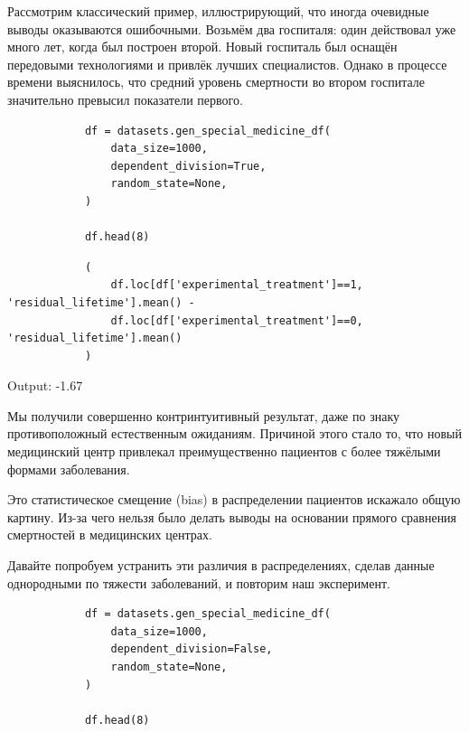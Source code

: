 \documentclass{article}
\begin{document}
        Рассмотрим классический пример, иллюстрирующий, что иногда очевидные выводы оказываются ошибочными.
        Возьмём два госпиталя: один действовал уже много лет, когда был построен второй.
        Новый госпиталь был оснащён передовыми технологиями и привлёк лучших специалистов.
        Однако в процессе времени выяснилось, что средний уровень смертности во втором госпитале значительно превысил показатели первого.


        \begin{verbatim}
            df = datasets.gen_special_medicine_df(
                data_size=1000,
                dependent_division=True,
                random_state=None,
            )

            df.head(8)
        \end{verbatim}

        

        \begin{verbatim}
            (
                df.loc[df['experimental_treatment']==1, 'residual_lifetime'].mean() -
                df.loc[df['experimental_treatment']==0, 'residual_lifetime'].mean()
            )
        \end{verbatim}

        Output: -1.67

        Мы получили совершенно контринтуитивный результат, даже по знаку противоположный естественным ожиданиям.
        Причиной этого стало то, что новый медицинский центр привлекал преимущественно пациентов с более тяжёлыми формами заболевания.

        Это статистическое смещение (bias) в распределении пациентов искажало общую картину.
        Из-за чего нельзя было делать выводы на основании прямого сравнения смертностей в медицинских центрах.

        Давайте попробуем устранить эти различия в распределениях, сделав данные однородными по тяжести заболеваний, и повторим наш эксперимент.


        \begin{verbatim}
            df = datasets.gen_special_medicine_df(
                data_size=1000,
                dependent_division=False,
                random_state=None,
            )

            df.head(8)
        \end{verbatim}
\end{document}
